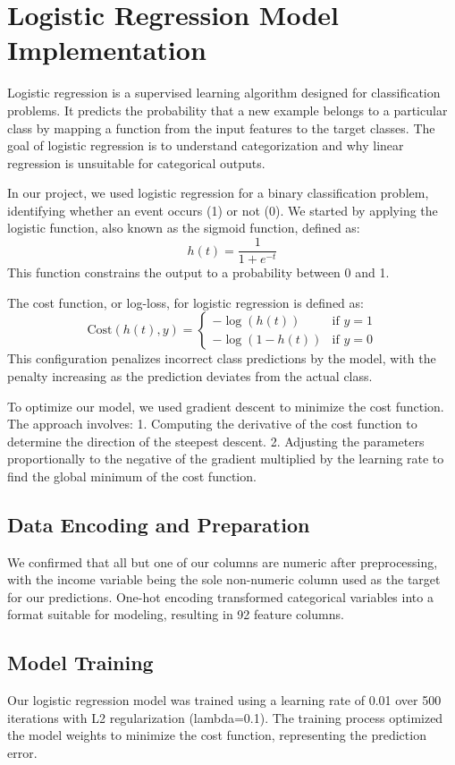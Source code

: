 \documentclass[12pt]{article}
\begin{document}
\section{Logistic Regression Model Implementation}

Logistic regression is a supervised learning algorithm designed for classification problems. It predicts the probability that a new example belongs to a particular class by mapping a function from the input features to the target classes. The goal of logistic regression is to understand categorization and why linear regression is unsuitable for categorical outputs. 

In our project, we used logistic regression for a binary classification problem, identifying whether an event occurs (1) or not (0). We started by applying the logistic function, also known as the sigmoid function, defined as:
\[ h(t) = \frac{1}{1 + e^{-t}} \]
This function constrains the output to a probability between 0 and 1.

The cost function, or log-loss, for logistic regression is defined as:
\[ \text{Cost}(h(t), y) = \begin{cases} 
- \log(h(t)) & \text{if } y = 1 \\
- \log(1 - h(t)) & \text{if } y = 0 
\end{cases} \]
This configuration penalizes incorrect class predictions by the model, with the penalty increasing as the prediction deviates from the actual class.

To optimize our model, we used gradient descent to minimize the cost function. The approach involves:
1. Computing the derivative of the cost function to determine the direction of the steepest descent.
2. Adjusting the parameters proportionally to the negative of the gradient multiplied by the learning rate to find the global minimum of the cost function.


\subsection{Data Encoding and Preparation}
We confirmed that all but one of our columns are numeric after preprocessing, with the income variable being the sole non-numeric column used as the target for our predictions. One-hot encoding transformed categorical variables into a format suitable for modeling, resulting in 92 feature columns.

\subsection{Model Training}
Our logistic regression model was trained using a learning rate of 0.01 over 500 iterations with L2 regularization (lambda=0.1). The training process optimized the model weights to minimize the cost function, representing the prediction error.
\end{document}
